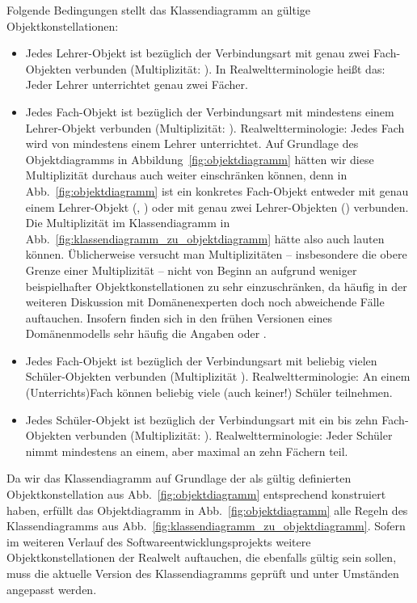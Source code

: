Folgende Bedingungen stellt das Klassendiagramm an gültige Objektkonstellationen:
\begin{itemize}
	\item Jedes Lehrer-Objekt ist bezüglich der Verbindungsart  mit genau zwei Fach-Objekten verbunden (Multiplizität: ). In Realweltterminologie heißt das: Jeder Lehrer unterrichtet genau zwei Fächer.
	\item Jedes Fach-Objekt ist bezüglich der Verbindungsart  mit mindestens einem Lehrer-Objekt verbunden (Multiplizität: ). Realwelt\-termi\-no\-logie: Jedes Fach wird von mindestens einem Lehrer unterrichtet. Auf Grundlage des Objektdiagramms in Abbildung~\ref{fig:objektdiagramm} hätten wir diese Multiplizität durchaus auch weiter einschränken können, denn in Abb.~\ref{fig:objektdiagramm} ist ein konkretes Fach-Objekt entweder mit genau einem Lehrer-Objekt (, ) oder mit genau zwei Lehrer-Objekten () verbunden. Die Multiplizität im Klassendiagramm in Abb.~\ref{fig:klassendiagramm_zu_objektdiagramm} hätte also auch  lauten können. Üblicherweise versucht man Multiplizitäten – insbesondere die obere Grenze einer Multiplizität – nicht von Beginn an aufgrund weniger beispielhafter Objekt\-konstellationen zu sehr einzuschränken, da häufig in der weiteren Diskussion mit Domänenexperten doch noch abweichende Fälle auftauchen. Insofern finden sich in den frühen Versionen eines Domänenmodells sehr häufig die Angaben \sttpUMLText{*} oder . 
	\item Jedes Fach-Objekt ist bezüglich der Verbindungsart  mit beliebig vielen Schüler-Objekten verbunden (Multiplizität \sttpUMLText{*}). Realweltterminologie: An einem (Unterrichts)Fach können beliebig viele (auch keiner!) Schüler teilnehmen. 
	\item Jedes Schüler-Objekt ist bezüglich der Verbindungsart  mit ein bis zehn Fach-Objekten verbunden (Multiplizität: ). Realweltterminologie: Jeder Schüler nimmt mindestens an einem, aber maximal an zehn Fächern teil. 
\end{itemize}

Da wir das Klassendiagramm auf Grundlage der als gültig definierten Objektkonstellation aus Abb.~\ref{fig:objektdiagramm} entsprechend konstruiert haben, erfüllt das Objektdiagramm in Abb.~\ref{fig:objektdiagramm} alle Regeln des Klassendiagramms aus Abb.~\ref{fig:klassendiagramm_zu_objektdiagramm}. Sofern im weiteren Verlauf des Softwareentwicklungsprojekts weitere Objektkonstellationen der Realwelt auftauchen, die ebenfalls gültig sein sollen, muss die aktuelle Version des Klassendiagramms geprüft und unter Umständen angepasst werden.

